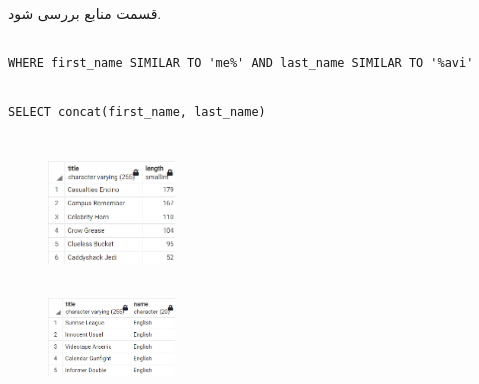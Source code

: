 \documentclass{article}
\begin{document}
قسمت منابع بررسی شود.

\subsection{}
\begin{latin}
\begin{lstlisting}
WHERE first_name SIMILAR TO 'me%' AND last_name SIMILAR TO '%avi'
\end{lstlisting}
\end{latin}

\subsection{}
\begin{latin}
\begin{lstlisting}
SELECT concat(first_name, last_name)
\end{lstlisting}
\end{latin}

\section{}

\subsection{}
\begin{figure}[ht]
    \centering
    \includegraphics[width=0.3\textwidth]{figures/4-a.png}
    \caption
	{
	}
    \label{fig:fig1}
\end{figure}

\subsection{}
\begin{figure}[ht]
    \centering
    \includegraphics[width=0.3\textwidth]{figures/4-b.png}
    \caption
	{
	}
    \label{fig:fig1}
\end{figure}
\end{document}
